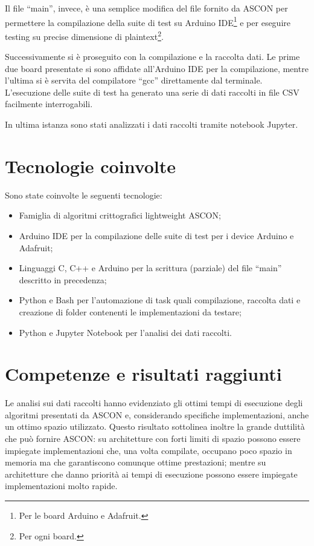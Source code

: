 \documentclass[a4paper, 12pt, italian]{extarticle}
\begin{document}
Il file ``main'', invece, è una semplice modifica del file fornito da ASCON per permettere la compilazione della suite di test su Arduino IDE\footnote{Per le board Arduino e Adafruit.} e per eseguire testing su precise dimensione di plaintext\footnote{Per ogni board.}.

Successivamente si è proseguito con la compilazione e la raccolta dati. Le prime due board presentate si sono affidate all'Arduino IDE per la compilazione, mentre l'ultima si è servita del compilatore ``gcc'' direttamente dal terminale. L'esecuzione delle suite di test ha generato una serie di dati raccolti in file CSV facilmente interrogabili.

In ultima istanza sono stati analizzati i dati raccolti tramite notebook Jupyter.

\section{Tecnologie coinvolte}

Sono state coinvolte le seguenti tecnologie:
\begin{itemize}
    \item Famiglia di algoritmi crittografici lightweight ASCON;
    \item Arduino IDE per la compilazione delle suite di test per i device Arduino e Adafruit;
    \item Linguaggi C, C++ e Arduino per la scrittura (parziale) del file ``main'' descritto in precedenza;
    \item Python e Bash per l'automazione di task quali compilazione, raccolta dati e creazione di folder contenenti le implementazioni da testare;
    \item Python e Jupyter Notebook per l'analisi dei dati raccolti.
\end{itemize}

\section{Competenze e risultati raggiunti}

Le analisi sui dati raccolti hanno evidenziato gli ottimi tempi di esecuzione degli algoritmi presentati da ASCON e, considerando specifiche implementazioni, anche un ottimo spazio utilizzato. Questo risultato sottolinea inoltre la grande duttilità che può fornire ASCON: su architetture con forti limiti di spazio possono essere impiegate implementazioni che, una volta compilate, occupano poco spazio in memoria ma che garantiscono comunque ottime prestazioni; mentre su architetture che danno priorità ai tempi di esecuzione possono essere impiegate implementazioni molto rapide.
\end{document}
